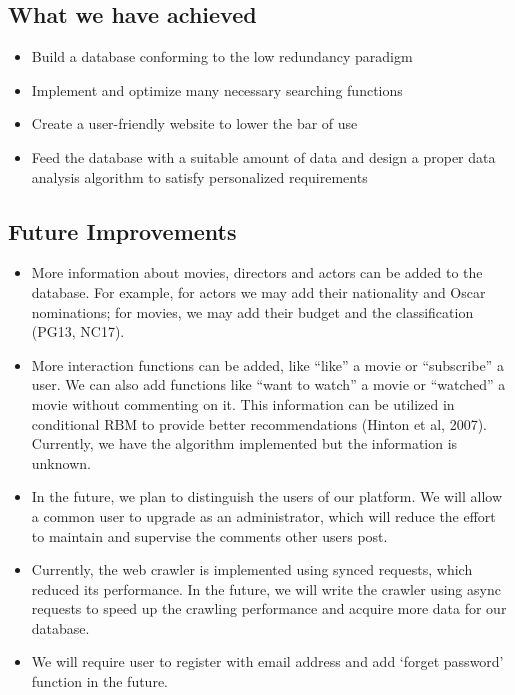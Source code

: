 \begin{CJK*}{UTF8}{gbsn}
\subsection{What we have achieved}
\begin{itemize}
\item Build a database conforming to the low redundancy paradigm
\item Implement and optimize many necessary  searching functions
\item Create a user-friendly website to lower the bar of use
\item Feed the database with a suitable amount of data and design a proper data analysis algorithm to satisfy personalized requirements
\end{itemize}
\subsection{Future Improvements}
\begin{itemize}
\item More information about movies, directors and actors can be added to the database. For example, for actors we may add their nationality and Oscar nominations; for movies, we may add their budget and the classification (PG13, NC17).
\item More interaction functions can be added, like ``like'' a movie or ``subscribe'' a user. We can also add functions like ``want to watch'' a movie or ``watched'' a movie without commenting on it. This information can be utilized in conditional RBM to provide better recommendations (Hinton et al, 2007). Currently, we have the algorithm implemented but the information is unknown. 
\item In the future, we plan to distinguish the users of our platform. We will allow a common user to upgrade as an administrator, which will reduce the effort to maintain and supervise the comments other users post.
\item Currently, the web crawler is implemented using synced requests, which reduced its performance. In the future, we will write the crawler using async requests to speed up the crawling performance and acquire more data for our database.
\item We will require user to register with email address and add `forget password' function in the future.
\end{itemize}


\end{CJK*}
